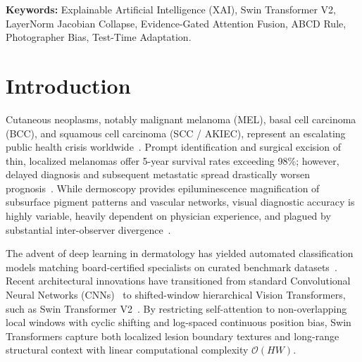 \documentclass[11pt,a4paper]{article}
\begin{document}
\vspace{0.5em}
\noindent\textbf{Keywords:} Explainable Artificial Intelligence (XAI), Swin Transformer V2, LayerNorm Jacobian Collapse, Evidence-Gated Attention Fusion, ABCD Rule, Photographer Bias, Test-Time Adaptation.

\newpage

\section{Introduction}
\label{sec:introduction}

Cutaneous neoplasms, notably malignant melanoma (MEL), basal cell carcinoma (BCC), and squamous cell carcinoma (SCC / AKIEC), represent an escalating public health crisis worldwide~\cite{esteva2017dermatologist, kittler2002diagnostic}. Prompt identification and surgical excision of thin, localized melanomas offer 5-year survival rates exceeding 98\%; however, delayed diagnosis and subsequent metastatic spread drastically worsen prognosis~\cite{argenziano2001dermoscopy, codella2024collaborative}. While dermoscopy provides epiluminescence magnification of subsurface pigment patterns and vascular networks, visual diagnostic accuracy is highly variable, heavily dependent on physician experience, and plagued by substantial inter-observer divergence~\cite{stolz1994abcd, haenssle2018man, brinker2019deep}.

The advent of deep learning in dermatology has yielded automated classification models matching board-certified specialists on curated benchmark datasets~\cite{esteva2017dermatologist, tschandl2020human, celebi2007methodological}. Recent architectural innovations have transitioned from standard Convolutional Neural Networks (CNNs)~\cite{he2016deep, tan2019efficientnet} to shifted-window hierarchical Vision Transformers, such as Swin Transformer V2~\cite{liu2021swin, liu2022swinv2}. By restricting self-attention to non-overlapping local windows with cyclic shifting and log-spaced continuous position bias, Swin Transformers capture both localized lesion boundary textures and long-range structural context with linear computational complexity $\mathcal{O}(HW)$.
\end{document}
